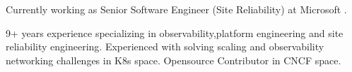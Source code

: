 

\begin{cvparagraph}

Currently working as Senior Software Engineer (Site Reliability) at Microsoft .

 9+ years experience specializing in observability,platform engineering and site reliability engineering.
 Experienced with solving scaling and observability networking challenges in K8s space.
 Opensource Contributor in CNCF space.
\end{cvparagraph}
